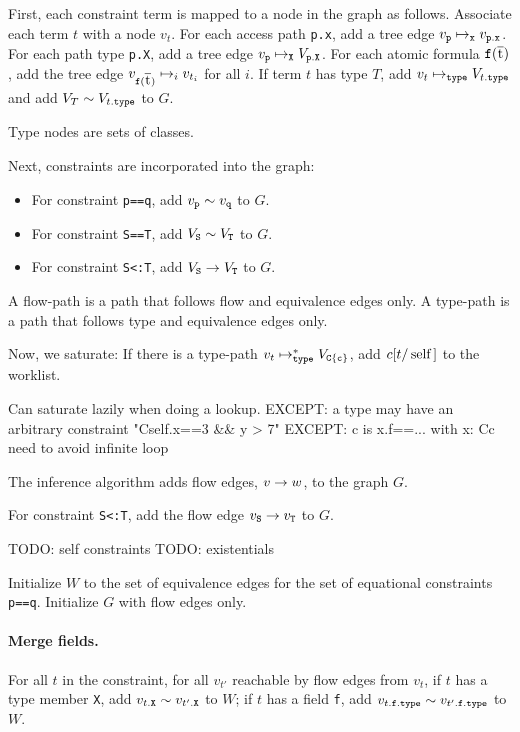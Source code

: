 \documentclass[preprint,nocopyrightspace,9pt]{sigplanconf}
\begin{document}
First, each constraint term is mapped to a node in the graph as
follows.
Associate each term $t$ with a node
$v_t$.  For each access path {\tt p.x}, add a tree edge
$v_{{\tt p}} \treeedge{{\tt x}} v_{{\tt p.x}}$.
For each path type {\tt p.X}, add a tree edge
$v_{{\tt p}} \treeedge{{\tt X}} V_{{\tt p.X}}$.
For each atomic formula ${\tt f}(\xbar{t})$, add the tree edge
$v_{{\tt f}(\xbar{t})} \treeedge{i} v_{t_i}$ for all $i$.
If term $t$ has type $T$, add $v_t \typeedge V_{t{\tt .type}}$
and
add $V_T \eqedge V_{t{\tt .type}}$ to $G$.

Type nodes are sets of classes.

Next, constraints are incorporated into the graph:

\begin{itemize}
\item
For constraint {\tt p==q}, add $v_{\tt p} \eqedge v_{\tt q}$ to $G$.

\item
For constraint {\tt S==T}, add $V_{\tt S} \eqedge V_{\tt T}$ to $G$.

\item
For constraint {\tt S<:T},
add $V_{\tt S} \flowedge V_{\tt T}$
to $G$.

\end{itemize}

A flow-path is a path that follows flow and equivalence edges
only.
A type-path is a path that follows type and equivalence edges
only.

Now, we saturate: 
If there is a type-path $v_t \typeedge^* V_{\tt C\{c\}}$,
add $c[t/\Xcd{self}]$ to the worklist.

        Can saturate lazily when doing a lookup.
        EXCEPT: a type may have an arbitrary constraint
                \xcd"C{self.x==3 && y > 7}"
        EXCEPT: c is x.f==...
                with x: C{c}
                need to avoid infinite loop

The inference algorithm adds
flow edges, $v \flowedge w$, to the graph $G$.

For constraint {\tt S<:T},
add the flow edge $v_{\tt S} \flowedge v_{\tt T}$
to $G$.

TODO: self constraints
TODO: existentials

Initialize $W$ to the set of equivalence edges for the set of
equational constraints {\tt p==q}.
Initialize $G$ with flow edges only.

\paragraph{Merge fields.}
For all $t$ in the constraint, for all
$v_{t'}$ reachable by flow edges from $v_t$,
if $t$ has a type member {\tt X},
add $v_{t.{\tt X}} \eqedge v_{t'.{\tt X}}$ to $W$;
if $t$ has a field {\tt f},
add $v_{t.{\tt f.type}} \eqedge v_{t'.{\tt f.type}}$ to $W$.
\end{document}
